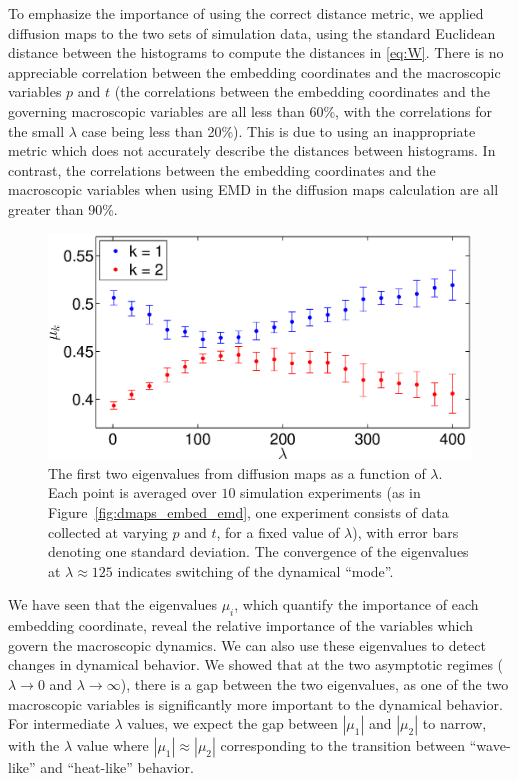 \documentclass[preprint]{elsarticle}
\begin{document}
To emphasize the importance of using the correct distance metric, we applied diffusion maps to the two sets of simulation data, using the standard Euclidean distance between the histograms to compute the distances in \eqref{eq:W}.
%
There is no appreciable correlation between the embedding coordinates and the macroscopic variables $p$ and $t$ (the correlations between the embedding coordinates and the governing macroscopic variables are all  less than 60\%, with the correlations for the small $\lambda$ case being less than 20\%). 
%
This is due to using an inappropriate metric which does not accurately describe the distances between histograms.
%
In contrast, the correlations between the embedding coordinates and the macroscopic variables when using EMD in the diffusion maps calculation are all greater than 90\%.



\begin{figure}[t] 
\centering
\includegraphics[width=\textwidth]{detect_change_eigenvalues}
\caption{The first two eigenvalues from diffusion maps as a function of $\lambda$. Each point is averaged over $10$ simulation experiments (as in Figure~\ref{fig:dmaps_embed_emd}, one experiment consists of data collected at varying $p$ and $t$, for a fixed value of $\lambda$), with error bars denoting one standard deviation. 
The convergence of the eigenvalues at $\lambda \approx 125$ indicates switching of the dynamical ``mode''.}
\label{fig:detect_change}
\end{figure}

We have seen that the eigenvalues $\mu_i$, which quantify the importance of each embedding coordinate, reveal the relative importance of the variables which govern the macroscopic dynamics.
%
We can also use these eigenvalues to detect changes in dynamical behavior.
%
We showed that at the two asymptotic regimes ($\lambda \rightarrow 0$ and $\lambda \rightarrow \infty$), there is a gap between the two eigenvalues, as one of the two macroscopic variables is significantly more important to the dynamical behavior.
%
For intermediate $\lambda$ values, we expect the gap between $|\mu_1|$ and $|\mu_2|$ to narrow, with the $\lambda$ value where $|\mu_1| \approx |\mu_2|$ corresponding to the transition between ``wave-like'' and ``heat-like'' behavior. 
\end{document}
